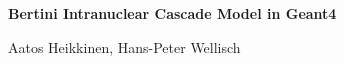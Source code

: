 
\def \PIC {pictures}


\vspace{5.5truecm}

\begin{center}
  \Large {\bf Bertini Intranuclear Cascade Model in {\sc Geant4} }
  \normalsize
  
  \vspace{1.5truecm} Aatos Heikkinen, Hans-Peter Wellisch
\end{center}
\thispagestyle{empty} \newpage

\tableofcontents
\newpage

  
%
  




\begin{appendix} 
%
\end{appendix} 


